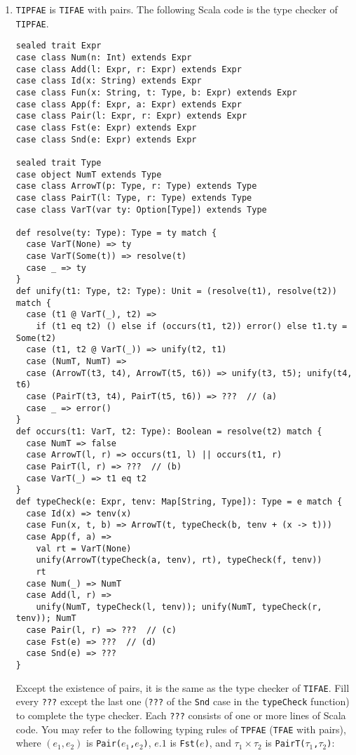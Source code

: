 \begin{enumerate}
\item \texttt{TIPFAE} is \texttt{TIFAE} with pairs. The following Scala
code is the type checker of \texttt{TIPFAE}.
\begin{verbatim}
sealed trait Expr
case class Num(n: Int) extends Expr
case class Add(l: Expr, r: Expr) extends Expr
case class Id(x: String) extends Expr
case class Fun(x: String, t: Type, b: Expr) extends Expr
case class App(f: Expr, a: Expr) extends Expr
case class Pair(l: Expr, r: Expr) extends Expr
case class Fst(e: Expr) extends Expr
case class Snd(e: Expr) extends Expr

sealed trait Type
case object NumT extends Type
case class ArrowT(p: Type, r: Type) extends Type
case class PairT(l: Type, r: Type) extends Type
case class VarT(var ty: Option[Type]) extends Type

def resolve(ty: Type): Type = ty match {
  case VarT(None) => ty
  case VarT(Some(t)) => resolve(t)
  case _ => ty
}
def unify(t1: Type, t2: Type): Unit = (resolve(t1), resolve(t2)) match {
  case (t1 @ VarT(_), t2) =>
    if (t1 eq t2) () else if (occurs(t1, t2)) error() else t1.ty = Some(t2)
  case (t1, t2 @ VarT(_)) => unify(t2, t1)
  case (NumT, NumT) =>
  case (ArrowT(t3, t4), ArrowT(t5, t6)) => unify(t3, t5); unify(t4, t6)
  case (PairT(t3, t4), PairT(t5, t6)) => ???  // (a)
  case _ => error()
}
def occurs(t1: VarT, t2: Type): Boolean = resolve(t2) match {
  case NumT => false
  case ArrowT(l, r) => occurs(t1, l) || occurs(t1, r)
  case PairT(l, r) => ???  // (b)
  case VarT(_) => t1 eq t2
}
def typeCheck(e: Expr, tenv: Map[String, Type]): Type = e match {
  case Id(x) => tenv(x)
  case Fun(x, t, b) => ArrowT(t, typeCheck(b, tenv + (x -> t)))
  case App(f, a) =>
    val rt = VarT(None)
    unify(ArrowT(typeCheck(a, tenv), rt), typeCheck(f, tenv))
    rt
  case Num(_) => NumT
  case Add(l, r) =>
    unify(NumT, typeCheck(l, tenv)); unify(NumT, typeCheck(r, tenv)); NumT
  case Pair(l, r) => ???  // (c)
  case Fst(e) => ???  // (d)
  case Snd(e) => ???
}
\end{verbatim}
Except the existence of pairs, it is the same as the type checker of \texttt{TIFAE}.
Fill every \texttt{???} except the last one (\texttt{???} of the \texttt{Snd} case in the
\texttt{typeCheck} function) to complete the type checker. Each \texttt{???} consists
of one or more lines of Scala code. You may refer to the following typing rules
of \texttt{TPFAE} (\texttt{TFAE} with pairs), where $(e_1,e_2)$ is \texttt{Pair($e_1$,$e_2$)},
$e{\textsf{.}1}$ is \texttt{Fst($e$)}, and $\tau_1\times\tau_2$ is
\texttt{PairT($\tau_1$,$\tau_2$)}:


\end{enumerate}

